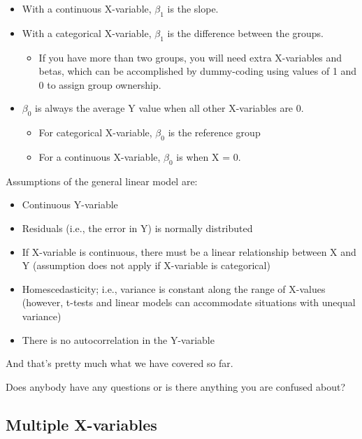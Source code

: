 \documentclass[
]{article}
\providecommand{\tightlist}{%
  \setlength{\itemsep}{0pt}\setlength{\parskip}{0pt}}
\begin{document}
\begin{itemize}
\tightlist
\item
  With a continuous X-variable, \(\beta_1\) is the slope.
\item
  With a categorical X-variable, \(\beta_1\) is the difference between
  the groups.

  \begin{itemize}
  \tightlist
  \item
    If you have more than two groups, you will need extra X-variables
    and betas, which can be accomplished by dummy-coding using values of
    1 and 0 to assign group ownership.
  \end{itemize}
\item
  \(\beta_0\) is always the average Y value when all other X-variables
  are 0.

  \begin{itemize}
  \tightlist
  \item
    For categorical X-variable, \(\beta_0\) is the reference group
  \item
    For a continuous X-variable, \(\beta_0\) is when X = 0.
  \end{itemize}
\end{itemize}

Assumptions of the general linear model are:

\begin{itemize}
\tightlist
\item
  Continuous Y-variable
\item
  Residuals (i.e., the error in Y) is normally distributed
\item
  If X-variable is continuous, there must be a linear relationship
  between X and Y (assumption does not apply if X-variable is
  categorical)
\item
  Homescedasticity; i.e., variance is constant along the range of
  X-values (however, t-tests and linear models can accommodate
  situations with unequal variance)
\item
  There is no autocorrelation in the Y-variable
\end{itemize}

And that's pretty much what we have covered so far.

Does anybody have any questions or is there anything you are confused
about?

\subsection{Multiple X-variables}\label{multiple-x-variables}
\end{document}
